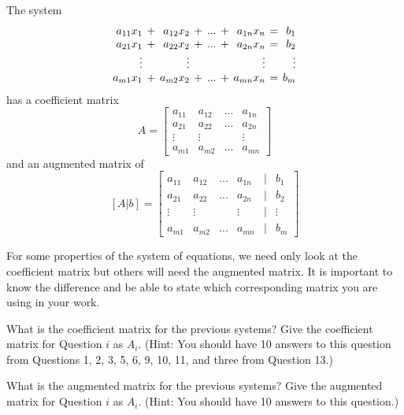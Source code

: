 The system
\begin{equation*}
\setlength{\arraycolsep}{2pt}
\begin{array}{rcrcrcrcr}
  a_{11} x_1  &+& a_{12} x_2 &+& ... &+&  a_{1n}x_n &=& b_1 \\ %
  a_{21} x_1  &+& a_{22} x_2 &+& ... &+&  a_{2n}x_n &=& b_2 \\
  \vdots  & & \vdots & &  & &  \vdots && \vdots \\
  a_{m1} x_1  &+& a_{m2} x_2 &+& ... &+&  a_{mn}x_n &=& b_m
\end{array}
\end{equation*}
has a coefficient matrix
$$A=\begin{bmatrix} a_{11} & a_{12} & ... &  a_{1n} \\
  a_{21}& a_{22}& ... &  a_{2n} \\
  \vdots  & \vdots &   &  \vdots   \\
  a_{m1}& a_{m2} & ... &  a_{mn}  \end{bmatrix}$$
and an augmented matrix of
$$[A|b]=\begin{bmatrix} a_{11} & a_{12} & ... &  a_{1n} &|&b_1\\
  a_{21}& a_{22}& ... &  a_{2n} &|&b_2\\
  \vdots  & \vdots &   &  \vdots &|& \vdots  \\
  a_{m1}& a_{m2} & ... &  a_{mn} &|&b_m \end{bmatrix}$$

For some properties of the system of equations, we need only look at the coefficient matrix but others will need the augmented matrix. It is important to know the difference and be able to state which corresponding matrix you are using in your work.

\begin{question} What is the coefficient matrix for the previous systems? Give the coefficient matrix for Question $i$ as $A_i$. (Hint: You should have 10 answers to this question from Questions 1, 2, 3, 5, 6, 9, 10, 11, and three from Question 13.)
\end{question}

\begin{question} What is the augmented matrix for the previous systems? Give the augmented matrix for Question $i$ as $A_i$. (Hint: You should have 10 answers to this question.)
\end{question}

